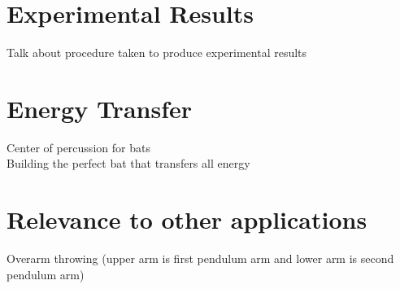 \documentclass[%
 aip,
rsi,%
 reprint,%
]{revtex4-1}
\begin{document}
\section{Experimental Results}
Talk about procedure taken to produce experimental results

\section{Energy Transfer}
Center of percussion for bats \cite{Cross2005}\\
\indent Building the perfect bat that transfers all energy

\section{Relevance to other applications}
Overarm throwing (upper arm is first pendulum arm and lower arm is second pendulum arm)


\end{document}
